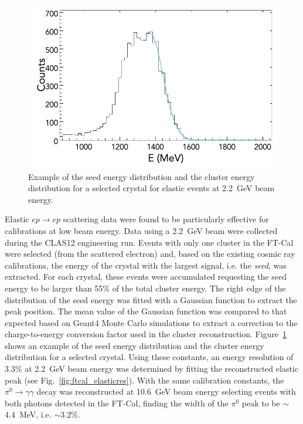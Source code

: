 \begin{figure}
\includegraphics[width=0.9\columnwidth]{fig/ftcal_elastic_seed.png}
\caption{Example of the seed energy distribution and the cluster energy distribution for a selected crystal for
  elastic events at 2.2~GeV beam energy.}
\label{fig:ftcal_elasticcal}
\end{figure}

Elastic $ep \to ep$ scattering data were found to be particularly effective for calibrations at low beam energy.
Data using a 2.2~GeV beam were collected during the CLAS12 engineering run. Events with only one cluster in the FT-Cal
were selected (from the scattered electron) and, based on the existing cosmic ray calibrations, the energy of the
crystal with the largest signal, i.e. the {\it seed}, was extracted. For each crystal, these events were accumulated
requesting the seed energy to be larger than 55\% of the total cluster energy. The right edge of the distribution of
the seed energy was fitted with a Gaussian function to extract the peak position. The mean value of the Gaussian
function was compared to that expected based on Geant4 Monte Carlo simulations to extract a correction to the
charge-to-energy conversion factor used in the cluster reconstruction. Figure~\ref{fig:ftcal_elasticcal} shows an
example of the seed energy distribution and the cluster energy distribution for a selected crystal. Using these
constants, an energy resolution of 3.3\% at 2.2~GeV beam energy was determined by fitting the reconstructed
elastic peak (see Fig.~\ref{fig:ftcal_elasticres}). With the same calibration constants, the $\pi^0\to\gamma\gamma$
decay was reconstructed at 10.6~GeV beam energy selecting events with both photons detected in the FT-Cal, finding
the width of the $\pi^0$ peak to be $\sim$4.4~MeV, i.e. $\sim 3.2\%$.

